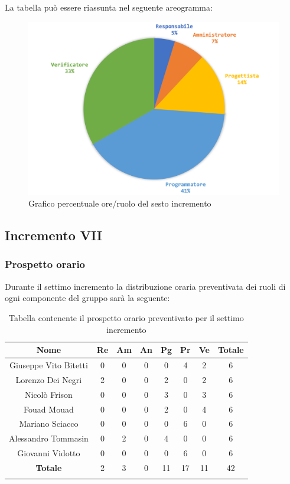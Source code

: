 		La tabella può essere riassunta nel seguente areogramma:
		\begin{figure}[H]
			\centering
			\includegraphics[width=0.8\linewidth]{./images/preventivo/incremento6-2.png}
			\caption{Grafico percentuale ore/ruolo del sesto incremento}
			\label{fig:grafico costi ruolo incremento VI}
		\end{figure}
		
		
		
		\subsection{Incremento VII}
		\subsubsection{Prospetto orario}
		Durante il settimo incremento la distribuzione oraria preventivata dei ruoli di ogni componente del gruppo sarà la seguente:
		
		\begin{longtable}{|c|c|c|c|c|c|c|c|}
			\hline
			\rowcolor{lighter-grayer}
			\textbf{Nome} & \textbf{Re} & \textbf{Am} & \textbf{An} & \textbf{Pg}  & \textbf{Pr}   & \textbf{Ve} & \textbf{Totale} \\
			\hline
			\endfirsthead
			
			\hline
			Giuseppe Vito Bitetti 		 & 0 & 0 & 0 & 0 & 4 & 2 & 6\\
			\hline
			\hline
			Lorenzo Dei Negri			 & 2 & 0 & 0 & 2 & 0 & 2 & 6\\
			\hline
			\hline
			Nicolò Frison				      & 0 & 0 & 0 & 3 & 0 & 3 & 6\\
			\hline
			\hline
			Fouad Mouad 				   & 0 & 0 & 0 & 2 & 0 & 4 & 6\\
			\hline
			\hline
			Mariano Sciacco 			 & 0 & 0 & 0 & 0 & 6 & 0 & 6\\
			\hline
			\hline
			Alessandro Tommasin    & 0 & 2 & 0 & 4 & 0 & 0 & 6\\
			\hline
			\hline
			Giovanni Vidotto 			  & 0 & 0 & 0 & 0 & 6 & 0 & 6\\
			\hline 
			\textbf{Totale}			 		& 2 & 3 & 0 & 11 & 17 & 11 & 42\\
			\hline
			\caption{Tabella contenente il prospetto orario preventivato per il settimo incremento}
		\end{longtable}
		\pagebreak
		
